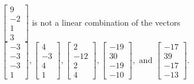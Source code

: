 \begin{exercise}
\begin{exerciseStatement}
  \end{exerciseStatement}
  \begin{exerciseAnswer}
   \(\left[\begin{array}{c}
9 \\
-2 \\
1 \\
3
\end{array}\right]\) 
  	 is not  
	a linear combination of the vectors \(\left[\begin{array}{c}
-3 \\
-3 \\
-3 \\
1
\end{array}\right] , \left[\begin{array}{c}
4 \\
-3 \\
4 \\
1
\end{array}\right] , \left[\begin{array}{c}
2 \\
-12 \\
2 \\
4
\end{array}\right] , \left[\begin{array}{c}
-19 \\
30 \\
-19 \\
-10
\end{array}\right] , \text{ and } \left[\begin{array}{c}
-17 \\
39 \\
-17 \\
-13
\end{array}\right]\).

	
  


  \end{exerciseAnswer}
\end{exercise}